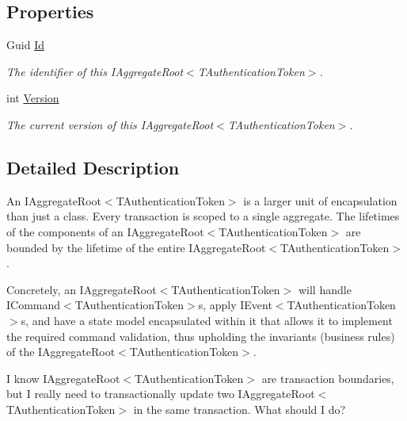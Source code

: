 \subsection*{Properties}
\begin{DoxyCompactItemize}
\item 
Guid \hyperlink{interfaceCqrs_1_1Domain_1_1IAggregateRoot_a04aa3198f1371afa345a58e8fcb713d7_a04aa3198f1371afa345a58e8fcb713d7}{Id}
\begin{DoxyCompactList}\small\item\em The identifier of this I\+Aggregate\+Root$<$\+T\+Authentication\+Token$>$. \end{DoxyCompactList}\item 
int \hyperlink{interfaceCqrs_1_1Domain_1_1IAggregateRoot_ad81adab68c0984330f735a1f5a661aa7_ad81adab68c0984330f735a1f5a661aa7}{Version}
\begin{DoxyCompactList}\small\item\em The current version of this I\+Aggregate\+Root$<$\+T\+Authentication\+Token$>$. \end{DoxyCompactList}\end{DoxyCompactItemize}


\subsection{Detailed Description}
An I\+Aggregate\+Root$<$\+T\+Authentication\+Token$>$ is a larger unit of encapsulation than just a class. Every transaction is scoped to a single aggregate. The lifetimes of the components of an I\+Aggregate\+Root$<$\+T\+Authentication\+Token$>$ are bounded by the lifetime of the entire I\+Aggregate\+Root$<$\+T\+Authentication\+Token$>$. 

Concretely, an I\+Aggregate\+Root$<$\+T\+Authentication\+Token$>$ will handle I\+Command$<$\+T\+Authentication\+Token$>$s, apply I\+Event$<$\+T\+Authentication\+Token$>$s, and have a state model encapsulated within it that allows it to implement the required command validation, thus upholding the invariants (business rules) of the I\+Aggregate\+Root$<$\+T\+Authentication\+Token$>$. 

I know I\+Aggregate\+Root$<$\+T\+Authentication\+Token$>$ are transaction boundaries, but I really need to transactionally update two I\+Aggregate\+Root$<$\+T\+Authentication\+Token$>$ in the same transaction. What should I do?

